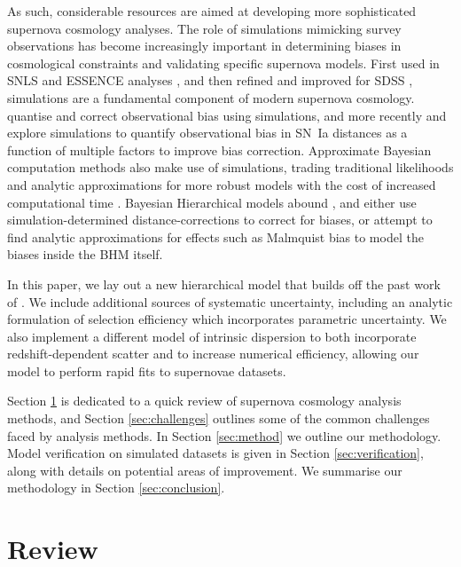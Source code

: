 \documentclass[a4paper,fleqn,usenatbib]{emulateapj}
\begin{document}
As such, considerable resources are aimed at developing more sophisticated supernova cosmology analyses. The role of simulations mimicking survey observations has become increasingly important in determining biases in cosmological constraints and validating specific supernova models. First used in SNLS \citep{Astier2006} and ESSENCE analyses \citep{Wood-Vasey2007}, and then refined and improved for SDSS \citep{Kessler2009}, simulations are a fundamental component of modern supernova cosmology.  \citet{Betoule2014} quantise and correct observational bias using simulations, and more recently \citet{Scolnic2016} and \citet{Kessler2017} explore simulations to quantify observational bias in SN~Ia distances as a function of multiple factors to improve bias correction. Approximate Bayesian computation methods also make use of simulations, trading traditional likelihoods and analytic approximations for more robust models with the cost of increased computational time \citep{Weyant2013, Jennings2016}. Bayesian Hierarchical models abound \citep{Mandel2009, March2011, March2014, Rubin2015, Shariff2016, Roberts2017}, and either use simulation-determined distance-corrections to correct for biases, or attempt to find analytic approximations for effects such as Malmquist bias to model the biases inside the BHM itself.



In this paper, we lay out a new hierarchical model that builds off the past work of \citet{Rubin2015}. We include additional sources of systematic uncertainty, including an analytic formulation of selection efficiency which incorporates parametric uncertainty. We also implement a different model of intrinsic dispersion to both incorporate redshift-dependent scatter and to increase numerical efficiency, allowing our model to perform rapid fits to supernovae datasets.

Section \ref{sec:review} is dedicated to a quick review of supernova cosmology analysis methods, and Section \ref{sec:challenges} outlines some of the common challenges faced by analysis methods. In Section \ref{sec:method} we outline our methodology. Model verification on simulated datasets is given in Section \ref{sec:verification}, along with details on potential areas of improvement. We summarise our methodology in Section \ref{sec:conclusion}.



\section{Review}
\label{sec:review}
\end{document}
